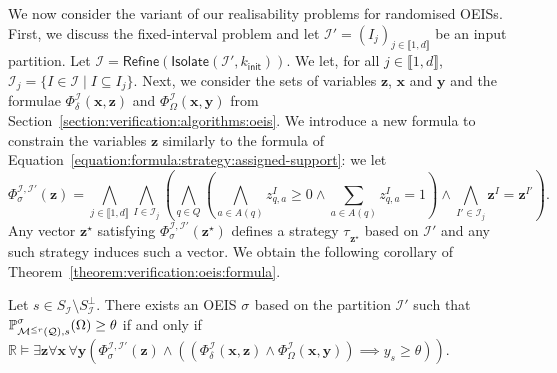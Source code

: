 \documentclass[a4paper,UKenglish,cleveref,autoref,thm-restate,colorlinks]{lipics-v2021}
\newcommand{\init}{\mathsf{init}}
\newcommand{\integerInterval}[1]{\llbracket{}#1\rrbracket{}}
\newcommand{\IR}{\mathbb{R}}
\newcommand{\mdp}{\mathcal{M}}
\newcommand{\mdpStateSpace}{S}
\newcommand{\ocmdp}{\mathcal{Q}}
\newcommand{\ocmdpFin}[2]{\mdp^{\leq #2}(#1)}
\newcommand{\ocStateSpace}{Q}
\newcommand{\ocState}{q}
\newcommand{\ocCount}{k}
\newcommand{\ocConfig}{s}
\newcommand{\ocActionSpace}{A}
\newcommand{\ocAction}{a}
\newcommand{\ocTrans}{\delta}
\newcommand{\counterUB}{r}
\newcommand{\intPart}{\mathcal{I}}
\newcommand{\interval}{I}
\newcommand{\intNum}{d}
\newcommand{\intIndex}{j}
\newcommand{\compressChainStateSpace}{\mdpStateSpace_{\intPart}}
\newcommand{\compressChainStateSpaceStar}{\mdpStateSpace_{\intPart}^{\bot}}
\newcommand{\varTrans}{x}
\newcommand{\varTransTuple}{\mathbf{\varTrans}}
\newcommand{\varObj}{y}
\newcommand{\varObjTuple}{\mathbf{\varObj}}
\newcommand{\varStrat}{z}
\newcommand{\varStratI}{\mathbf{\varStrat}^{\interval}}
\newcommand{\varStratIprime}{\mathbf{\varStrat}^{\interval'}}
\newcommand{\varStratTuple}{\mathbf{\varStrat}}
\newcommand{\solStratTuple}{\mathbf{\varStrat}^{\star}}
\newcommand{\formulaTransBase}{\Phi_{\ocTrans}}
\newcommand{\formulaObjBase}{\Phi_{\objective}}
\newcommand{\formulaStratBase}{\Phi_{\strat}}
\newcommand{\formulaTrans}{\formulaTransBase^\intPart}
\newcommand{\formulaObj}{\formulaObjBase^\intPart}
\newcommand{\formulaStrat}{\formulaStratBase^{\intPart,\intPart'}}
\newcommand{\objective}{\Omega}
\newcommand{\thresProba}{\theta}
\newcommand{\stratGeneric}[1]{{\sigma_{#1}}}
\newcommand{\strat}{\stratGeneric{}}
\newcommand{\stratBGeneric}[1]{{\tau_{#1}}}
\newcommand{\stratB}{\stratBGeneric{}}
\begin{document}
We now consider the variant of our realisability problems for randomised OEISs.
First, we discuss the fixed-interval problem and let $\intPart' =(\interval_{\intIndex})_{\intIndex\in\integerInterval{1, \intNum}}$ be an input partition.
Let $\intPart=\mathsf{Refine}(\mathsf{Isolate}(\intPart', \ocCount_\init))$.
We let, for all $\intIndex\in\integerInterval{1, \intNum}$, $\intPart_\intIndex = \{\interval\in\intPart\mid\interval\subseteq\interval_\intIndex\}$.
Next, we consider the sets of variables $\varStratTuple$, $\varTransTuple$ and $\varObjTuple$ and the formulae $\formulaTrans(\varTransTuple, \varStratTuple)$ and $\formulaObj(\varTransTuple, \varObjTuple)$ from Section~\ref{section:verification:algorithms:oeis}.
We introduce a new formula to constrain the variables $\varStratTuple$ similarly to the formula of Equation~\eqref{equation:formula:strategy:assigned-support}: we let
\begin{equation}\label{equation:formula:strategy:free-support}
  \formulaStrat(\varStratTuple) =
  \bigwedge_{\intIndex\in\integerInterval{1, \intNum}}
  \bigwedge_{\interval\in\intPart_\intIndex}
  \left(
  \bigwedge_{\ocState\in\ocStateSpace}\left(
    \bigwedge_{\ocAction\in\ocActionSpace(\ocState)}
      \varStrat_{\ocState,\ocAction}^{\interval} \geq 0\land
      \sum_{\ocAction\in\ocActionSpace(\ocState)}\varStrat_{\ocState,\ocAction}^{\interval} = 1
    \right)\land
    \bigwedge_{\interval'\in\intPart_\intIndex}
    \varStratI = \varStratIprime
  \right).
\end{equation}
Any vector $\solStratTuple$ satisfying $\formulaStrat(\solStratTuple)$ defines a strategy $\stratB_{\solStratTuple}$ based on $\intPart'$ and any such strategy induces such a vector.
We obtain the following corollary of Theorem~\ref{theorem:verification:oeis:formula}.
\begin{theorem}\label{theorem:synthesis:oeis:formula}
  Let $\ocConfig\in\compressChainStateSpace\setminus\compressChainStateSpaceStar$.
  There exists an OEIS $\strat$ based on the partition $\intPart'$ such that $\probaGverb{\ocmdpFin{\ocmdp}{\counterUB}}{\ocConfig}{\strat}(\objective) \geq\thresProba$ if and only if $\IR\models\exists\varStratTuple\forall\varTransTuple\,\forall\varObjTuple (\formulaStrat(\varStratTuple)\land((\formulaTrans(\varTransTuple,\varStratTuple)\land\formulaObj(\varTransTuple, \varObjTuple))\implies \varObj_\ocConfig\geq\thresProba))$.
\end{theorem}
\end{document}
